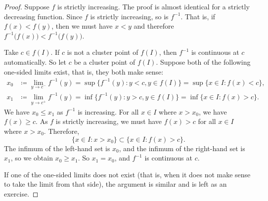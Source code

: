 \begin{proof}
Suppose $f$ is strictly increasing.  The proof is almost
identical for a strictly decreasing function.
Since $f$ is strictly increasing, so is $f^{-1}$.  That is, if $f(x) <
f(y)$, then we must have $x < y$ and therefore
$f^{-1}\bigl(f(x)\bigr) < f^{-1}\bigl(f(y)\bigr)$.

Take $c \in f(I)$.
If $c$ is not a cluster point of $f(I)$, then $f^{-1}$ is continuous at $c$
automatically.  So let $c$ be a cluster point of $f(I)$.
Suppose both of the following one-sided limits exist, that is, they both
make sense:
\begin{align*}
x_0 & \coloneqq \lim_{y \to c^-} f^{-1}(y) =
\sup \bigl\{ f^{-1}(y) : y < c, y \in f(I) \bigr\}
=
\sup \bigl\{ x \in I : f(x) < c \bigr\} , \\
x_1 & \coloneqq \lim_{y \to c^+} f^{-1}(y) =
\inf \bigl\{ f^{-1}(y) : y > c, y \in f(I) \bigr\}
=
\inf \bigl\{ x \in I : f(x) > c \bigr\} .
\end{align*}
We have $x_0 \leq x_1$ as $f^{-1}$ is increasing.
For all $x \in I$ where $x > x_0$, we have $f(x) \geq c$.  As $f$ is strictly increasing,
we must have $f(x) > c$ for all $x \in I$ where $x > x_0$.  Therefore,
\begin{equation*}
\{ x \in I : x > x_0 \} \subset \bigl\{ x \in I : f(x) > c \bigr\}.
\end{equation*}
The infimum of the left-hand set is $x_0$, and the infimum of the right-hand
set is $x_1$, so we obtain $x_0 \geq x_1$.
So $x_1 = x_0$, and $f^{-1}$ is continuous at $c$.

If one of the one-sided limits does not exist (that is, when it does not
make sense to take the limit from that side), the argument is similar
and is left as an exercise.
\end{proof}

